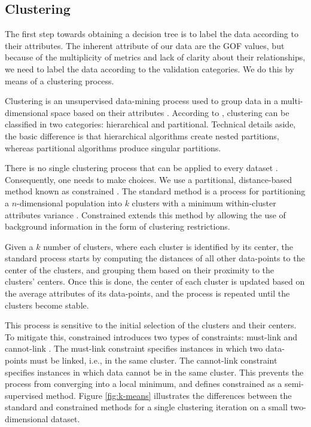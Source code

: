 
\subsection{Clustering}
\label{sec:clustering}

The first step towards obtaining a decision tree is to label the data according to their attributes. The inherent attribute of our data are the GOF values, but because of the multiplicity of metrics and lack of clarity about their relationships, we need to label the data according to the validation categories. We do this by means of a clustering process. 

Clustering is an unsupervised data-mining process used to group data in a multi-dimensional space based on their attributes \citep{Fayyad_1996_IEEE}. According to \citet{Jain_1999_ACMCS}, clustering can be classified in two categories: hierarchical and partitional. Technical details aside, the basic difference is that hierarchical algorithms create nested partitions, whereas partitional algorithms produce singular partitions. 

There is no single clustering process that can be applied to every dataset \citep{Dy_2004_MLR, Jain_1988_Book, Hartigan_1985_JOC}. Consequently, one needs to make choices. We use a partitional, distance-based method known as constrained \kmeans{}. The standard \kmeans{} method is a process for partitioning a $n$-dimensional population into $k$ clusters with a minimum within-cluster attributes variance \citep[e.g.,][]{Macqueen_1967_Proc}. Constrained \kmeans{} extends this method by allowing the use of background information in the form of clustering restrictions.

Given a $k$ number of clusters, where each cluster is identified by its center, the standard process starts by computing the distances of all other data-points to the center of the clusters, and grouping them based on their proximity to the clusters' centers. Once this is done, the center of each cluster is updated based on the average attributes of its data-points, and the process is repeated until the clusters become stable.

This process is sensitive to the initial selection of the clusters and their centers. To mitigate this, constrained \kmeans{} introduces two types of constraints: must-link and cannot-link \citep{Wagstaff_2001_Proc}. The must-link constraint specifies instances in which two data-points must be linked, i.e., in the same cluster. The cannot-link constraint specifies instances in which data cannot be in the same cluster. This prevents the process from converging into a local minimum, and defines constrained \kmeans{} as a semi-supervised method. Figure \ref{fig:k-means} illustrates the differences between the standard and constrained \kmeans{} methods for a single clustering iteration on a small two-dimensional dataset.

